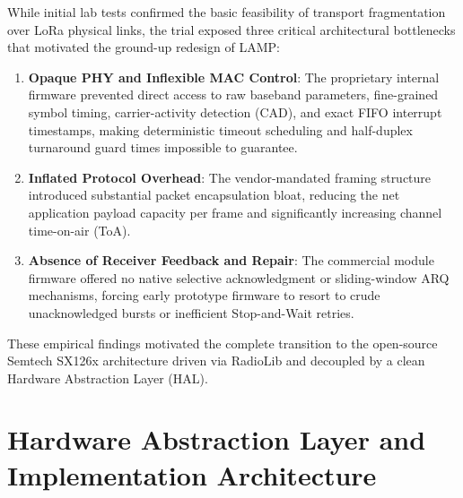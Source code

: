 \documentclass[journal]{IEEEtran}
\begin{document}
While initial lab tests confirmed the basic feasibility of transport fragmentation over LoRa physical links, the trial exposed three critical architectural bottlenecks that motivated the ground-up redesign of LAMP:
\begin{enumerate}
  \item \textbf{Opaque PHY and Inflexible MAC Control}: The proprietary internal firmware prevented direct access to raw baseband parameters, fine-grained symbol timing, carrier-activity detection (CAD), and exact FIFO interrupt timestamps, making deterministic timeout scheduling and half-duplex turnaround guard times impossible to guarantee.
  \item \textbf{Inflated Protocol Overhead}: The vendor-mandated framing structure introduced substantial packet encapsulation bloat, reducing the net application payload capacity per frame and significantly increasing channel time-on-air (ToA).
  \item \textbf{Absence of Receiver Feedback and Repair}: The commercial module firmware offered no native selective acknowledgment or sliding-window ARQ mechanisms, forcing early prototype firmware to resort to crude unacknowledged bursts or inefficient Stop-and-Wait retries.
\end{enumerate}

These empirical findings motivated the complete transition to the open-source Semtech SX126x architecture driven via RadioLib and decoupled by a clean Hardware Abstraction Layer (HAL).

\section{Hardware Abstraction Layer and Implementation Architecture}
\label{sec:supp_hal}
\end{document}
